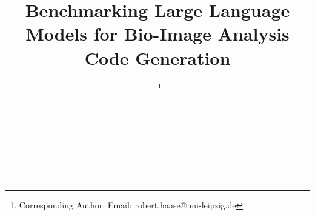 \documentclass{ecai}
\begin{document}

\begin{frontmatter}




\title{Benchmarking Large Language Models for Bio-Image Analysis Code Generation}


\author[A,B]{~\thanks{Corresponding Author. Email: robert.haase@uni-leipzig.de}}
\author[C]{~}
\author[D]{~}
\author[E,B]{~ } 

\address[A]{Data Science Center, Leipzig University, Humboldtstra{\ss}e 25, 04105 Leipzig, Germany}
\address[B]{Center for Scalable Data Analytics and Artificial Intelligence (ScaDS.AI) Dresden / Leipzig}
\address[C]{Data Science Centre, European Molecular Biology Laboratory, Meyerhofstra{\ss}e 1, 69117 Heidelberg, Germany}
\address[D]{Cell Biology and Biophysics Unit, European Molecular Biology Laboratory, Meyerhofstra{\ss}e 1, 69117 Heidelberg, Germany}
\address[E]{Max Planck Institute for Human Cognitive and Brain Sciences, Stephanstra{\ss}e 1A, 04103, Leipzig, Germany}



\end{frontmatter}
\end{document}
